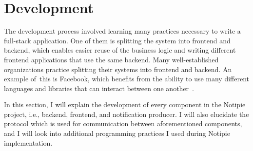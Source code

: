 \section{Development}\label{sec:development}

The development process involved learning many practices
necessary to write a full-stack application.
One of them is splitting the system
into frontend and backend,
which enables easier reuse of the business logic
and writing different frontend applications
that use the same backend.
Many well-established organizations practice splitting
their systems into frontend and backend.
An example of~this is Facebook,
which benefits from the ability to use
many different languages and libraries
that can interact between one another~\cite{abdullah_frontend_2014}.

In this section,
I will explain the development of every component
in the Notipie project, i.e.,
backend,
frontend, and
notification producer.
I will also elucidate the protocol
which is used for communication between aforementioned components,
and I will look into additional programming practices
I used during Notipie implementation.






